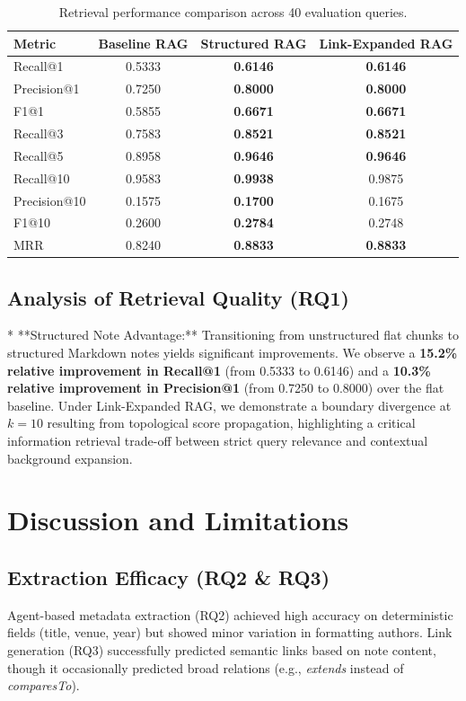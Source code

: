 \documentclass[11pt, a4paper, oneside]{article}
\begin{document}
\begin{table}[h!]
\centering
\begin{tabular}{lccc}
\toprule
\textbf{Metric} & \textbf{Baseline RAG} & \textbf{Structured RAG} & \textbf{Link-Expanded RAG} \\ 
\midrule
Recall@1 & 0.5333 & \textbf{0.6146} & \textbf{0.6146} \\
Precision@1 & 0.7250 & \textbf{0.8000} & \textbf{0.8000} \\
F1@1 & 0.5855 & \textbf{0.6671} & \textbf{0.6671} \\ 
\midrule
Recall@3 & 0.7583 & \textbf{0.8521} & \textbf{0.8521} \\
Recall@5 & 0.8958 & \textbf{0.9646} & \textbf{0.9646} \\ 
\midrule
Recall@10 & 0.9583 & \textbf{0.9938} & 0.9875 \\
Precision@10 & 0.1575 & \textbf{0.1700} & 0.1675 \\
F1@10 & 0.2600 & \textbf{0.2784} & 0.2748 \\ 
\midrule
MRR & 0.8240 & \textbf{0.8833} & \textbf{0.8833} \\
\bottomrule
\end{tabular}
\caption{Retrieval performance comparison across 40 evaluation queries.}
\label{tab:results_metrics}
\end{table}

\subsection{Analysis of Retrieval Quality (RQ1)}
* **Structured Note Advantage:** Transitioning from unstructured flat chunks to structured Markdown notes yields significant improvements. We observe a \textbf{15.2\% relative improvement in Recall@1} (from 0.5333 to 0.6146) and a \textbf{10.3\% relative improvement in Precision@1} (from 0.7250 to 0.8000) over the flat baseline. Under Link-Expanded RAG, we demonstrate a boundary divergence at $k=10$ resulting from topological score propagation, highlighting a critical information retrieval trade-off between strict query relevance and contextual background expansion. 

\section{Discussion and Limitations}
\label{sec:discussion}

\subsection{Extraction Efficacy (RQ2 & RQ3)}
Agent-based metadata extraction (RQ2) achieved high accuracy on deterministic fields (title, venue, year) but showed minor variation in formatting authors. Link generation (RQ3) successfully predicted semantic links based on note content, though it occasionally predicted broad relations (e.g., \textit{extends} instead of \textit{comparesTo}).
\end{document}
